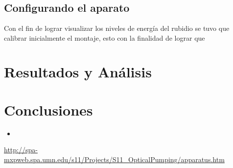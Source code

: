 \documentclass[%
 reprint,
 amsmath,amssymb,
 aps,
]{revtex4-1}
\begin{document}
\subsection{Configurando el aparato}
Con el fin de lograr visualizar los niveles de energía del rubidio se tuvo que calibrar inicialmente el montaje, esto con la finalidad de lograr que

\section{Resultados y Análisis}



\section{Conclusiones}
\begin{itemize}
    \item 
\end{itemize}

\begin{thebibliography}{9}
\url{http://spa-mxpweb.spa.umn.edu/s11/Projects/S11_OpticalPumping/apparatus.htm}

\end{thebibliography}
\end{document}
